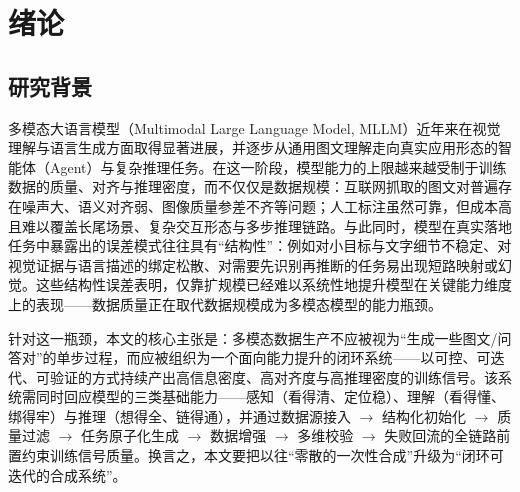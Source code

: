 \chapter{绪论}
\label{chap:intro}

\section{研究背景}

多模态大语言模型（Multimodal Large Language Model, MLLM）近年来在视觉理解与语言生成方面取得显著进展\citep{openai2024gpt4o,team2023gemini,bai2025qwen25vl,liu2024visual}，并逐步从通用图文理解走向真实应用形态的智能体（Agent）与复杂推理任务\citep{wu2024osatlas,xie2024osworld,llmguiaentsurvey2024}。在这一阶段，模型能力的上限越来越受制于训练数据的质量、对齐与推理密度，而不仅仅是数据规模：互联网抓取的图文对普遍存在噪声大、语义对齐弱、图像质量参差不齐等问题\citep{schuhmann2022laion5b,byeon2022coyo,hessel2021clipscore}；人工标注虽然可靠，但成本高且难以覆盖长尾场景、复杂交互形态与多步推理链路\citep{wang2023selfinstruct,mukherjee2023orca}。与此同时，模型在真实落地任务中暴露出的误差模式往往具有“结构性”：例如对小目标与文字细节不稳定\citep{liu2024seeclick,du2020ppocr}、对视觉证据与语言描述的绑定松散\citep{li2023pope}、对需要先识别再推断的任务易出现短路映射或幻觉\citep{marino2019okvqa,zhang2023multimodalcot}。这些结构性误差表明，仅靠扩规模已经难以系统性地提升模型在关键能力维度上的表现\citep{chen2023sharegpt4v,xu2024mmevol,liu2025synthvlm}——数据质量正在取代数据规模成为多模态模型的能力瓶颈。

针对这一瓶颈，本文的核心主张是：多模态数据生产不应被视为“生成一些图文/问答对”的单步过程，而应被组织为一个面向能力提升的闭环系统——以可控、可迭代、可验证的方式持续产出高信息密度、高对齐度与高推理密度的训练信号。该系统需同时回应模型的三类基础能力——感知（看得清、定位稳）、理解（看得懂、绑得牢）与推理（想得全、链得通），并通过数据源接入 $\rightarrow$ 结构化初始化 $\rightarrow$ 质量过滤 $\rightarrow$ 任务原子化生成 $\rightarrow$ 数据增强 $\rightarrow$ 多维校验 $\rightarrow$ 失败回流的全链路前置约束训练信号质量。换言之，本文要把以往“零散的一次性合成”升级为“闭环可迭代的合成系统”。

